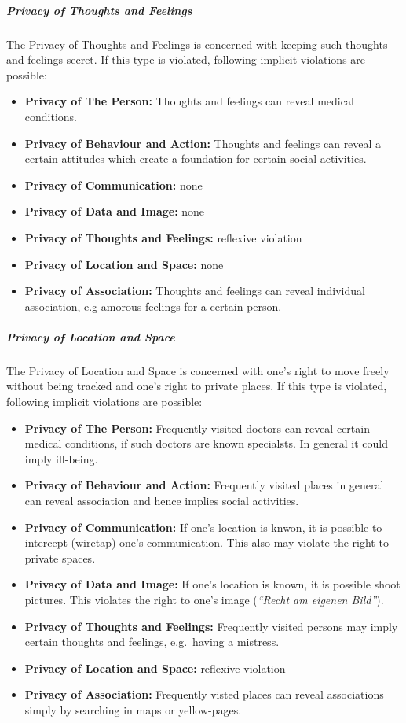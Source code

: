 \subparagraph{Privacy of Thoughts and Feelings}

The Privacy of Thoughts and Feelings is concerned with keeping such
thoughts and feelings secret. If this type is violated, following
implicit violations are possible:

\begin{itemize}
\itemsep1pt\parskip0pt
\item
  \textbf{Privacy of The Person:} Thoughts and feelings can reveal
  medical conditions.
\item
  \textbf{Privacy of Behaviour and Action:} Thoughts and feelings can
  reveal a certain attitudes which create a foundation for certain
  social activities.
\item
  \textbf{Privacy of Communication:} none
\item
  \textbf{Privacy of Data and Image:} none
\item
  \textbf{Privacy of Thoughts and Feelings:} reflexive violation
\item
  \textbf{Privacy of Location and Space:} none
\item
  \textbf{Privacy of Association:} Thoughts and feelings can reveal
  individual association, e.g amorous feelings for a certain person.
\end{itemize}

\subparagraph{Privacy of Location and Space}

The Privacy of Location and Space is concerned with one's right to move
freely without being tracked and one's right to private places. If this
type is violated, following implicit violations are possible:

\begin{itemize}
\itemsep1pt\parskip0pt
\item
  \textbf{Privacy of The Person:} Frequently visited doctors can reveal
  certain medical conditions, if such doctors are known specialsts. In
  general it could imply ill-being.
\item
  \textbf{Privacy of Behaviour and Action:} Frequently visited places in
  general can reveal association and hence implies social activities.
\item
  \textbf{Privacy of Communication:} If one's location is knwon, it is
  possible to intercept (wiretap) one's communication. This also may
  violate the right to private spaces.
\item
  \textbf{Privacy of Data and Image:} If one's location is known, it is
  possible shoot pictures. This violates the right to one's image
  (\emph{``Recht am eigenen Bild''}).
\item
  \textbf{Privacy of Thoughts and Feelings:} Frequently visited persons
  may imply certain thoughts and feelings, e.g.~having a mistress.
\item
  \textbf{Privacy of Location and Space:} reflexive violation
\item
  \textbf{Privacy of Association:} Frequently visted places can reveal
  associations simply by searching in maps or yellow-pages.
\end{itemize}

